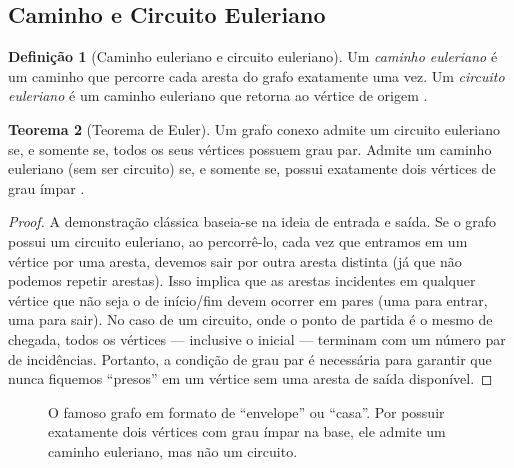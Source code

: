 \documentclass[
  12pt,
  oneside,
  a4paper,
  english,
  brazilian
  ]{abntex2}
\theoremstyle{definition}
\newtheorem{definicao}{Definição}[chapter]
\newtheorem{teorema}[definicao]{Teorema}
\begin{document}
\subsection{Caminho e Circuito Euleriano}
\label{sec:euleriano}

\begin{definicao}[Caminho euleriano e circuito euleriano]
\label{def:euleriano}
  Um \textit{caminho euleriano} é um caminho que percorre cada aresta do grafo
  exatamente uma vez. Um \textit{circuito euleriano} é um caminho euleriano
  que retorna ao vértice de origem \cite{euler1736}.
\end{definicao}

\begin{teorema}[Teorema de Euler]
\label{teo:euler}
  Um grafo conexo admite um circuito euleriano se, e somente se, todos os seus
  vértices possuem grau par. Admite um caminho euleriano (sem ser circuito) se,
  e somente se, possui exatamente dois vértices de grau ímpar
  \cite{diestel2017}.
\end{teorema}

\begin{proof}
  A demonstração clássica baseia-se na ideia de entrada e saída. Se o grafo possui um circuito euleriano, ao percorrê-lo, cada vez que entramos em um vértice por uma aresta, devemos sair por outra aresta distinta (já que não podemos repetir arestas). Isso implica que as arestas incidentes em qualquer vértice que não seja o de início/fim devem ocorrer em pares (uma para entrar, uma para sair). No caso de um circuito, onde o ponto de partida é o mesmo de chegada, todos os vértices — inclusive o inicial — terminam com um número par de incidências. Portanto, a condição de grau par é necessária para garantir que nunca fiquemos ``presos'' em um vértice sem uma aresta de saída disponível.
\end{proof}

\begin{figure}[htbp]
    \centering
    \caption{O famoso grafo em formato de ``envelope'' ou ``casa''. Por possuir exatamente dois vértices com grau ímpar na base, ele admite um caminho euleriano, mas não um circuito.}
    \label{fig:euleriano}
\end{figure}
\end{document}
